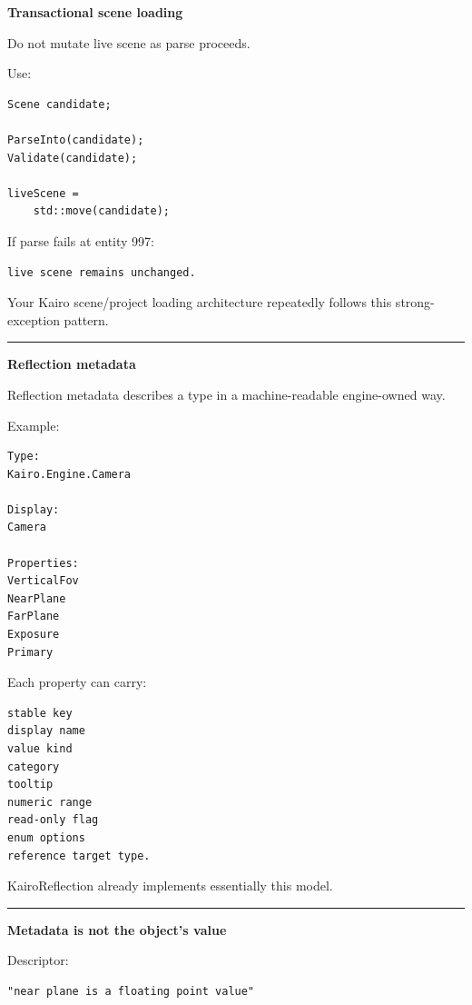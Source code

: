 \textbf{Transactional scene loading}

Do not mutate live scene as parse proceeds.

Use:

\begin{verbatim}
Scene candidate;

ParseInto(candidate);
Validate(candidate);

liveScene =
    std::move(candidate);
\end{verbatim}

If parse fails at entity 997:

\begin{verbatim}
live scene remains unchanged.
\end{verbatim}

Your Kairo scene/project loading architecture repeatedly follows this strong-exception pattern.

\begin{center}\rule{0.5\linewidth}{0.5pt}\end{center}

\textbf{Reflection metadata}

Reflection metadata describes a type in a machine-readable engine-owned way.

Example:

\begin{verbatim}
Type:
Kairo.Engine.Camera

Display:
Camera

Properties:
VerticalFov
NearPlane
FarPlane
Exposure
Primary
\end{verbatim}

Each property can carry:

\begin{verbatim}
stable key
display name
value kind
category
tooltip
numeric range
read-only flag
enum options
reference target type.
\end{verbatim}

KairoReflection already implements essentially this model.

\begin{center}\rule{0.5\linewidth}{0.5pt}\end{center}

\textbf{Metadata is not the object's value}

Descriptor:

\begin{verbatim}
"near plane is a floating point value"
\end{verbatim}

